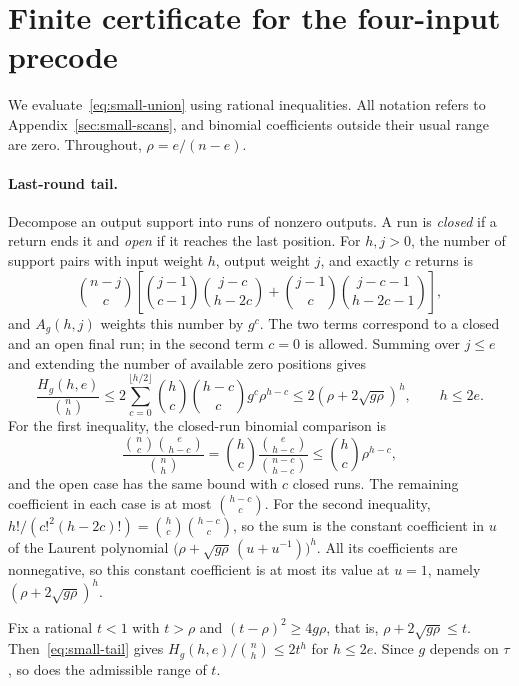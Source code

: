 \section{Finite certificate for the four-input precode}
\label{app:small-certificate}

We evaluate~\eqref{eq:small-union} using rational inequalities. All
notation refers to Appendix~\ref{sec:small-scans}, and binomial coefficients
outside their usual range are zero. Throughout, $\rho=e/(n-e)$.

\paragraph{Last-round tail.}
Decompose an output support into runs of nonzero outputs. A run is
\emph{closed} if a return ends it and \emph{open} if it reaches the last
position. For $h,j>0$, the number of support pairs with input weight $h$,
output weight $j$, and exactly $c$ returns is
\[
 \binom{n-j}{c}\left[
 \binom{j-1}{c-1}\binom{j-c}{h-2c}
 +\binom{j-1}{c}\binom{j-c-1}{h-2c-1}\right],
\]
and $A_g(h,j)$ weights this number by $g^c$. The two terms correspond to
a closed and an open final run; in the second term $c=0$ is allowed.
Summing over $j\le e$ and extending the number of available zero
positions gives
\begin{equation}\label{eq:small-tail}
 \frac{H_g(h,e)}{\binom nh}
 \le 2\sum_{c=0}^{\lfloor h/2\rfloor}
       \binom hc\binom{h-c}{c}g^c \rho^{h-c}
 \le 2(\rho+2\sqrt{g\rho})^h,\qquad h\le2e.
\end{equation}
For the first inequality, the closed-run binomial comparison is
\[
 \frac{\binom nc\binom e{h-c}}{\binom nh}
 =\binom hc\frac{\binom e{h-c}}{\binom{n-c}{h-c}}
 \le\binom hc \rho^{h-c},
\]
and the open case has the same bound with $c$ closed runs. The remaining
coefficient in each case is at most $\binom{h-c}{c}$. For the second
inequality, $h!/(c!^2(h-2c)!)=\binom hc\binom{h-c}{c}$, so the sum is
the constant coefficient in $u$ of the Laurent polynomial
$\bigl(\rho+\sqrt{g\rho}\,(u+u^{-1})\bigr)^h$. All its coefficients are
nonnegative, so this constant coefficient is at most its value at $u=1$,
namely $(\rho+2\sqrt{g\rho})^h$.

Fix a rational $t<1$ with $t>\rho$ and $(t-\rho)^2\ge4g\rho$, that is,
$\rho+2\sqrt{g\rho}\le t$. Then~\eqref{eq:small-tail} gives
$H_g(h,e)/\binom nh\le2t^h$ for $h\le2e$. Since $g$ depends on $\tau$,
so does the admissible range of $t$.

